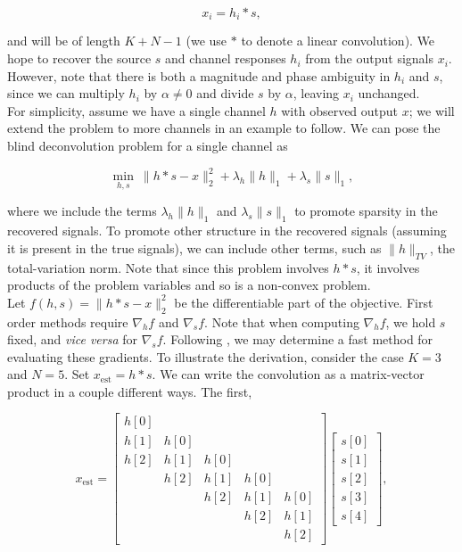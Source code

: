 \documentclass[journal]{IEEEtran}
\begin{document}
\[ x_i = h_i\ast s, \] 

\noindent and will be of length $K+N-1$ (we use $\ast$ to denote a linear convolution).  We hope to recover the source $s$ and channel responses $h_i$ from the output signals $x_i$.   However, note that there is both a magnitude and phase ambiguity in $h_i$ and $s$, since we can multiply $h_i$ by $\alpha\neq 0$ and divide $s$ by $\alpha$, leaving $x_i$ unchanged.\\

For simplicity, assume we have a single channel $h$ with observed output $x$; we will extend the problem to more channels in an example to follow.  We can pose the blind deconvolution problem for a single channel as

\[ \min_{h,s}~ \|h\ast s-x\|_2^2 + \lambda_h\|h\|_1 + \lambda_s \|s\|_1, \] 

\noindent where we include the terms $\lambda_h\|h\|_1$ and $\lambda_s\|s\|_1$ to promote sparsity in the recovered signals.  To promote other structure in the recovered signals (assuming it is present in the true signals), we can include other terms, such as $\|h\|_{TV}$, the total-variation norm.  Note that since this problem involves $h\ast s$, it involves products of the problem variables and so is a non-convex problem.\\

Let $f(h,s)=\|h\ast s -x\|_2^2$ be the differentiable part of the objective.  First order methods require $\nabla_hf$ and $\nabla_sf$.  Note that when computing $\nabla_hf$, we hold $s$ fixed, and \emph{vice versa} for $\nabla_sf$.  Following \cite{claerbout_1992}, we may determine a fast method for evaluating these gradients.  To illustrate the derivation, consider the case $K=3$ and $N=5$.  Set $x_\text{est}=h\ast s$.  We can write the convolution as a matrix-vector product in a couple different ways.  The first,

\[ x_\text{est} = \begin{bmatrix} h[0]\\h[1]&h[0]\\h[2]&h[1]&h[0]\\&h[2]&h[1]&h[0]\\&&h[2]&h[1]&h[0]\\&&&h[2]&h[1]\\&&&&h[2]\end{bmatrix}\begin{bmatrix}s[0]\\s[1]\\s[2]\\s[3]\\s[4]\end{bmatrix}, \] 
\end{document}

